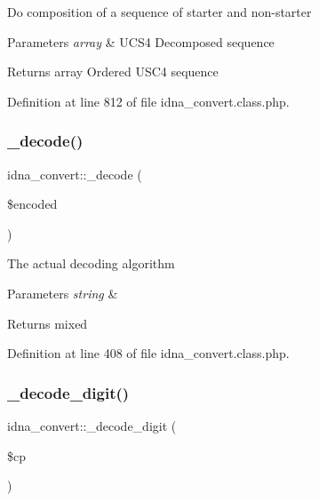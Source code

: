 Do composition of a sequence of starter and non-\/starter 
\begin{DoxyParams}{Parameters}
{\em array} & U\+C\+S4 Decomposed sequence \\
\hline
\end{DoxyParams}
\begin{DoxyReturn}{Returns}
array Ordered U\+S\+C4 sequence 
\end{DoxyReturn}


Definition at line 812 of file idna\+\_\+convert.\+class.\+php.

\hypertarget{classidna__convert_a6e4c2f051cfd4ebd84d47c013c18205e}{}\label{classidna__convert_a6e4c2f051cfd4ebd84d47c013c18205e} 
\subsubsection{\texorpdfstring{\+\_\+decode()}{\_decode()}}
{\footnotesize\ttfamily idna\+\_\+convert\+::\+\_\+decode (\begin{DoxyParamCaption}\item[{}]{\$encoded }\end{DoxyParamCaption})\hspace{0.3cm}{\ttfamily [protected]}}

The actual decoding algorithm 
\begin{DoxyParams}{Parameters}
{\em string} & \\
\hline
\end{DoxyParams}
\begin{DoxyReturn}{Returns}
mixed 
\end{DoxyReturn}


Definition at line 408 of file idna\+\_\+convert.\+class.\+php.

\hypertarget{classidna__convert_adb87b0a6d3168899e718dff394723e96}{}\label{classidna__convert_adb87b0a6d3168899e718dff394723e96} 
\subsubsection{\texorpdfstring{\+\_\+decode\+\_\+digit()}{\_decode\_digit()}}
{\footnotesize\ttfamily idna\+\_\+convert\+::\+\_\+decode\+\_\+digit (\begin{DoxyParamCaption}\item[{}]{\$cp }\end{DoxyParamCaption})\hspace{0.3cm}{\ttfamily [protected]}}

